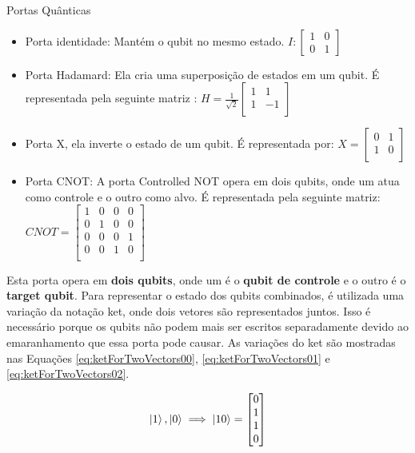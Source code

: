	\begin{frame}[allowframebreaks]{Portas Quânticas}
		\begin{itemize}
			\item Porta identidade: Mantém o qubit no mesmo estado.
			$I : \begin{bmatrix}
					1& 0 \\
					0& 1
				\end{bmatrix}$
			
			\item Porta Hadamard: Ela cria uma superposição de estados em um qubit. É representada pela seguinte matriz \cite{qcfcs}:
			$H = \frac{1}{\sqrt{2}}\begin{bmatrix}
				1 & 1 \\
				1 & -1 \\
			\end{bmatrix}$
			\item Porta X, ela inverte o estado de um qubit. É representada por:
			$X = \begin{bmatrix}
				0 & 1 \\
				1 & 0 \\
			\end{bmatrix}$
			\item Porta CNOT: A porta Controlled NOT opera em dois qubits, onde um atua como controle e o outro como alvo. É representada pela seguinte matriz:
			$CNOT = \begin{bmatrix}
				1 & 0 & 0 & 0 \\
				0 & 1 & 0 & 0 \\
				0 & 0 & 0 & 1 \\
				0 & 0 & 1 & 0 \\
			\end{bmatrix}$
		\end{itemize}
	
		\par Esta porta opera em \textbf{dois qubits}, onde um é o \textbf{qubit de controle} e o outro é o \textbf{target qubit}. Para representar o estado dos qubits combinados, é utilizada uma variação da notação ket, onde dois vetores são representados juntos. Isso é necessário porque os qubits não podem mais ser escritos separadamente devido ao emaranhamento que essa porta pode causar. As variações do ket são mostradas nas Equações \ref{eq:ketForTwoVectors00}, \ref{eq:ketForTwoVectors01} e \ref{eq:ketForTwoVectors02}.
	
		\begin{equation}
			\label{eq:ketForTwoVectors00}
			\ket{1}, \ket{0} \implies
			\ket{10} = \begin{bmatrix}
				0 \\
				1 \\
				1 \\
				0
			\end{bmatrix}				
		\end{equation}
		

\end{frame}
